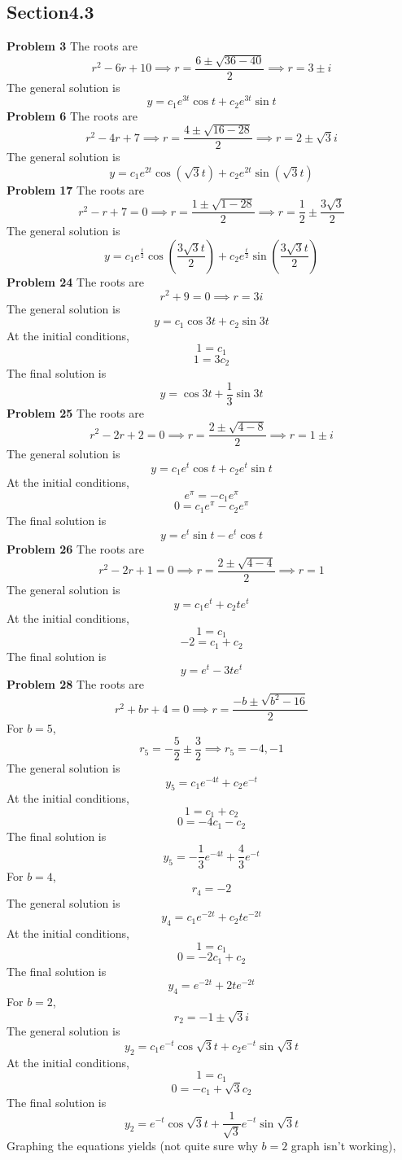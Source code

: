 \subsection*{Section4.3}
\textbf{Problem 3}
The roots are 
\[
    r^2- 6r + 10 
    \implies r = \frac{6 \pm \sqrt{36-40}}{2}
    \implies r = 3 \pm i
\]
The general solution is
\[
    y = c_1e^{3t}\cos t + c_2e^{3t}\sin t
\]
\textbf{Problem 6}
The roots are 
\[
    r^2-4r+7
    \implies r = \frac{4 \pm \sqrt{16-28}}{2}
    \implies r = 2 \pm \sqrt{3}i
\]
The general solution is 
\[
    y = c_1e^{2t}\cos (\sqrt{3}t) + c_2e^{2t}\sin (\sqrt{3}t)
\]
\textbf{Problem 17}
The roots are 
\[
    r^2-r+7 = 0 
    \implies r = \frac{1 \pm \sqrt{1-28}}{2}
    \implies r = \frac{1}{2} \pm \frac{3\sqrt{3}}{2}
\]
The general solution is 
\[
    y = c_1e^{\frac{t}{2}}\cos (\frac{3\sqrt{3}t}{2}) + 
        c_2e^{\frac{t}{2}}\sin (\frac{3\sqrt{3}t}{2})
\]
\textbf{Problem 24}
The roots are 
\[
    r^2 + 9 = 0
    \implies r = 3i
\]
The general solution is 
\[
    y = c_1\cos 3t + c_2\sin 3t
\]
At the initial conditions,
\[
    1 = c_1
\]
\[
    1 = 3c_2
\]
The final solution is 
\[
    y = \cos 3t + \frac{1}{3}\sin 3t
\]
\textbf{Problem 25}
The roots are 
\[
    r^2 - 2r + 2 = 0
    \implies r = \frac{2 \pm \sqrt{4-8}}{2}
    \implies r = 1 \pm i
\]
The general solution is 
\[
    y = c_1e^t\cos t + c_2e^t\sin t
\]
At the initial conditions,
\[
    e^\pi = -c_1e^\pi 
\]
\[
    0 = c_1e^\pi-c_2e^\pi
\]
The final solution is 
\[
    y = e^t\sin t - e^t\cos t
\]
\textbf{Problem 26}
The roots are 
\[
    r^2 - 2r + 1 = 0
    \implies r = \frac{2 \pm \sqrt{4-4}}{2}
    \implies r = 1
\]
The general solution is 
\[
    y = c_1e^t + c_2te^t
\]
At the initial conditions,
\[
    1 = c_1 
\]
\[
    -2 = c_1 + c_2
\]
The final solution is 
\[
    y = e^t - 3te^t
\]
\textbf{Problem 28}
The roots are 
\[
    r^2 + br + 4 = 0
    \implies r = \frac{-b \pm \sqrt{b^2-16}}{2}
\]
For $b=5$,
\[
    r_5 = -\frac{5}{2} \pm \frac{3}{2}
    \implies r_5 = -4, -1
\]
The general solution is 
\[
    y_5 = c_1e^{-4t} + c_2e^{-t}
\]
At the initial conditions,
\[
    1 = c_1 + c_2
\]
\[
    0 = -4c_1 - c_2
\]
The final solution is 
\[
    y_5 = -\frac{1}{3}e^{-4t} + \frac{4}{3}e^{-t}
\]
For $b=4$,
\[
    r_4 = -2
\]
The general solution is 
\[
    y_4 = c_1e^{-2t} + c_2te^{-2t}
\]
At the initial conditions,
\[
    1 = c_1 
\]
\[
    0 = -2c_1 + c_2
\]
The final solution is 
\[
    y_4 = e^{-2t} + 2te^{-2t}
\]
For $b=2$,
\[
    r_2 = -1 \pm \sqrt{3}i
\]
The general solution is 
\[
    y_2 = c_1e^{-t}\cos \sqrt{3}t + c_2e^{-t}\sin \sqrt{3}t
\]
At the initial conditions,
\[
    1 = c_1
\]
\[
    0 = -c_1 + \sqrt{3} c_2
\]
The final solution is 
\[
    y_2 = e^{-t}\cos \sqrt{3}t + \frac{1}{\sqrt{3}}e^{-t}\sin \sqrt{3}t
\]
Graphing the equations yields
(not quite sure why $b=2$ graph isn't working),

